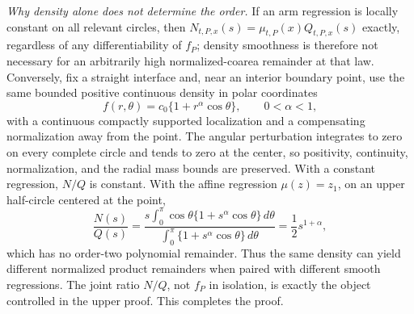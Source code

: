 \emph{Why density alone does not determine the order.}
If an arm regression is locally constant on all relevant circles, then \(N_{t,P,x}(s)=\mu_{t,P}(x)Q_{t,P,x}(s)\) exactly, regardless of any differentiability of \(f_P\); density smoothness is therefore not necessary for an arbitrarily high normalized-coarea remainder at that law.  Conversely, fix a straight interface and, near an interior boundary point, use the same bounded positive continuous density in polar coordinates
\[
 f(r,\theta)=c_0\{1+r^\alpha\cos\theta\},
 \qquad 0<\alpha<1,
\]
with a continuous compactly supported localization and a compensating normalization away from the point.  The angular perturbation integrates to zero on every complete circle and tends to zero at the center, so positivity, continuity, normalization, and the radial mass bounds are preserved.  With a constant regression, \(N/Q\) is constant.  With the affine regression \(\mu(z)=z_1\), on an upper half-circle centered at the point,
\[
 \frac{N(s)}{Q(s)}
 =\frac{s\int_0^\pi\cos\theta\{1+s^\alpha\cos\theta\}\,d\theta}
 {\int_0^\pi\{1+s^\alpha\cos\theta\}\,d\theta}
 =\frac12s^{1+\alpha},
\]
which has no order-two polynomial remainder.  Thus the same density can yield different normalized product remainders when paired with different smooth regressions.  The joint ratio \(N/Q\), not \(f_P\) in isolation, is exactly the object controlled in the upper proof.  This completes the proof.